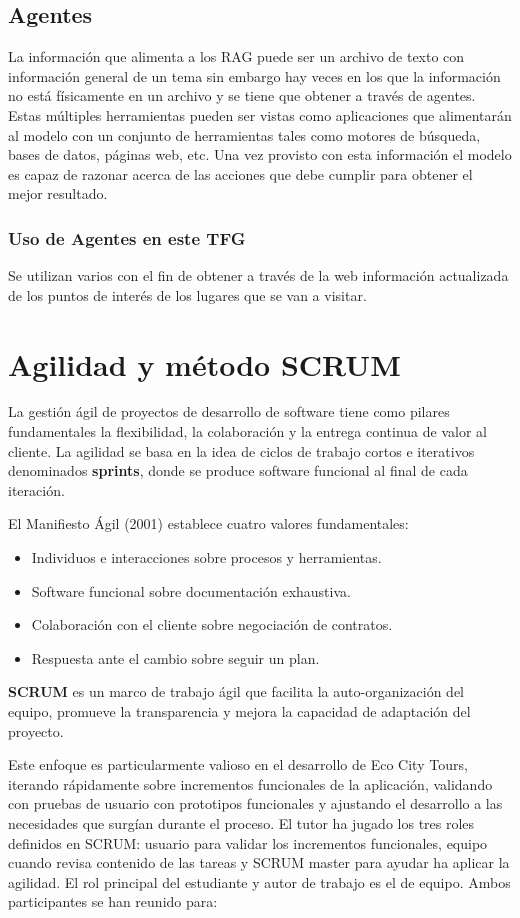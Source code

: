 	
	\subsection{Agentes}
	\label{sec:agentes}
	La información que alimenta a los RAG puede ser un archivo de texto con información general de un tema sin embargo hay veces en los que la información no está físicamente en un archivo y se tiene que obtener a través de agentes.
	Estas múltiples herramientas pueden ser vistas como aplicaciones que alimentarán al modelo con un conjunto de herramientas tales como motores de búsqueda, bases de datos, páginas web, etc. Una vez provisto con esta información el modelo es capaz de razonar acerca de las acciones que debe cumplir para obtener el mejor resultado.
	\subsubsection{Uso de Agentes en este TFG}
	Se utilizan varios con el fin de obtener a través de la web información actualizada de los puntos de interés de los lugares que se van a visitar.

\section{Agilidad y método SCRUM}
La gestión ágil de proyectos de desarrollo de software tiene como pilares fundamentales la flexibilidad, la colaboración y la entrega continua de valor al cliente\cite{agile_alliance}. La agilidad se basa en la idea de ciclos de trabajo cortos e iterativos denominados \textbf{sprints}, donde se produce software funcional al final de cada iteración.

El Manifiesto Ágil (2001) establece cuatro valores fundamentales:
\begin{itemize}
\item Individuos e interacciones sobre procesos y herramientas.
\item Software funcional sobre documentación exhaustiva.
\item Colaboración con el cliente sobre negociación de contratos.
\item Respuesta ante el cambio sobre seguir un plan.
\end{itemize}

\textbf{SCRUM} es un marco de trabajo ágil que facilita la auto-organización del equipo, promueve la transparencia y mejora la capacidad de adaptación del proyecto.

Este enfoque es particularmente valioso en el desarrollo de Eco City Tours, iterando rápidamente sobre incrementos funcionales de la aplicación, validando con pruebas de usuario con prototipos funcionales y ajustando el desarrollo a las necesidades que surgían durante el proceso. El tutor ha jugado los tres roles definidos en SCRUM: usuario para validar los incrementos funcionales, equipo cuando revisa contenido de las tareas y SCRUM master para ayudar ha aplicar la agilidad. El rol principal del estudiante y autor de trabajo es el de equipo. Ambos participantes se han reunido para:

